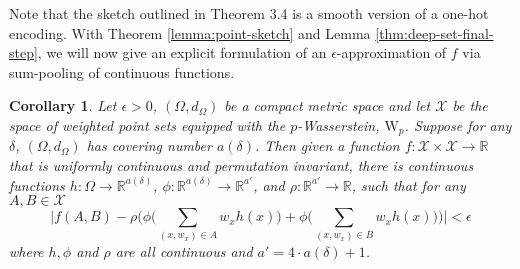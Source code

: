 \documentclass[12pt]{article}
\newcommand{\R}{\mathbb R}
\newtheorem{corollary}[theorem]{Corollary}
\begin{document}
Note that the sketch outlined in Theorem 3.4 is a smooth version of a one-hot encoding. With Theorem \ref{lemma:point-sketch} and Lemma \ref{thm:deep-set-final-step}, we will now give an explicit formulation of an $\epsilon$-approximation of $f$ via sum-pooling of continuous functions. 
\begin{corollary}
\label{corollary:product-net-universality}
    Let $\epsilon > 0$, $(\Omega, d_\Omega)$ be a compact metric space and let $\mathcal{X}$ be the space of weighted point sets equipped with the $p$-Wasserstein, $\mathrm{W}_p$. Suppose for any $\delta$, $(\Omega, d_\Omega)$ has covering number $a(\delta)$. Then given a function $f: \mathcal{X} \times \mathcal{X} \to \R$ that is uniformly continuous and permutation invariant, there is continuous functions $h: \Omega \to \R^{a(\delta)}$, $\phi: \R^{a(\delta)} \to \R^{a'}$, and $\rho: \R^{a'} \to \R$, such that for any $A, B \in \mathcal{X}$
    \begin{equation*}
        \Bigg|f(A, B) - \rho\Big(\phi\Big(\sum_{(x, w_x) \in A} w_xh(x)\Big) + \phi\Big(\sum_{(x, w_x) \in B}w_xh(x)\Big)\Big) \Bigg| < \epsilon
    \end{equation*}
    where $h, \phi$ and $\rho$ are all continuous and $a' = 4 \cdot a(\delta) + 1$. 
\end{corollary}
\end{document}
